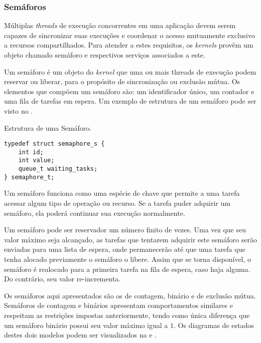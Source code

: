 \subsubsection{Semáforos}

Múltiplas \emph{threads} de execução concorrentes em uma aplicação devem serem capazes de sincronizar suas execuções e coordenar o acesso mutuamente exclusivo a recursos compartilhados. Para atender a estes requisitos, os \emph{kernels} provêm um objeto chamado semáforo e respectivos serviços associados a este.

Um semáforo é um objeto do \emph{kernel} que uma ou mais threads de execução podem reservar ou liberar, para o propósito de sincronização ou exclusão mútua. Os elementos que compõem um semáforo são: um identificador único, um contador e uma fila de tarefas em espera. Um exemplo de estrutura de um semáforo pode ser visto no .

\begin{listing}
	\caption{Estrutura de uma Semáforo.}
	\label{alg:struct_semaphore}
	\centering
	\begin{verbatim}
typedef struct semaphore_s {
	int id;
	int value;
	queue_t waiting_tasks;
} semaphore_t;
	\end{verbatim}
\end{listing}

Um semáforo funciona como uma espécie de chave que permite a uma tarefa acessar algum tipo de operação ou recurso. Se a tarefa puder adquirir um semáforo, ela poderá continuar sua execução normalmente.

Um semáforo pode ser reservador um número finito de vezes. Uma vez que seu valor máximo seja alcançado, as tarefas que tentarem adquirir este semáforo serão enviadas para uma lista de espera, onde permanecerão até que uma tarefa que tenha alocado previamente o semáforo o libere. Assim que se torna disponível, o semáforo é realocado para a primeira tarefa na fila de espera, caso haja alguma. Do contrário, seu valor re-incrementa.

Os semáforos aqui apresentados são os de contagem, binário e de exclusão mútua. Semáforos de contagem e binários apresentam comportamentos similares e respeitam as restrições impostas anteriormente, tendo como única diferença que um semáforo binário possui seu valor máximo igual a $1$. Os diagramas de estados destes dois modelos podem ser visualizados na  e .


